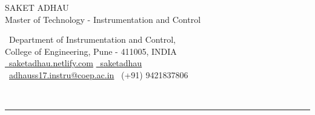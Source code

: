 \documentclass[11pt]{resume}
\newcommand{\makeheading}[2][]
{\hspace*{-\marginparsep minus \marginparwidth}
	\begin{minipage}[t]{\textwidth+\marginparwidth+\marginparsep}
		{\large \bfseries #2 \hfill #1}\\[-0.15\baselineskip]
		\rule{\columnwidth}{0pt}
\end{minipage}}
\providecommand*\email[1]{\href{mailto:#1}{#1}}
\begin{document}
	\makeheading{    
		\begin{center}
			\LARGE{SAKET ADHAU \\ \small{Master of Technology - Instrumentation and Control}} 
		\end{center}
		\newlength{\rcollength}\setlength{\rcollength}{2.35in}%
\begin{center}
	\normalsize{\textnormal{
			\Letter~Department of Instrumentation and Control,\\ College of Engineering, Pune - 411005, INDIA\\				
			\href{https://saketadhau.netlify.com/} 
			{\Mundus~saketadhau.netlify.com}
			\href{https://www.linkedin.com/in/saketadhau/} 
			{\faLinkedinSquare~saketadhau}  \\
			\Email~{\email{adhauss17.instru@coep.ac.in}}
			\Mobilefone~(+91) 9421837806}}\vspace{-8mm}
\end{center}
	}\vspace{2mm}
\end{document}
